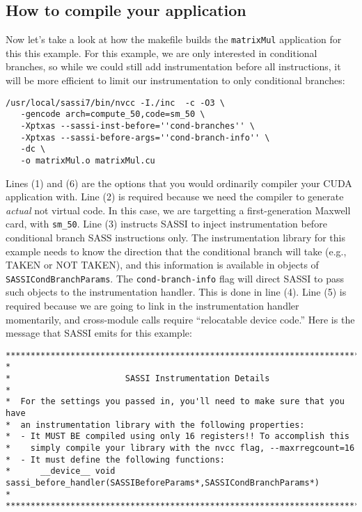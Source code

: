 \subsection{How to compile your application}

Now let's take a look at how the makefile builds the
\texttt{matrixMul} application for this this example.  For this
example, we are only interested in conditional branches, so while we
could still add instrumentation before all instructions, it will be
more efficient to limit our instrumentation to only conditional branches:
\begin{lstlisting}[style=BashInputStyle]
/usr/local/sassi7/bin/nvcc -I./inc  -c -O3 \
   -gencode arch=compute_50,code=sm_50 \
   -Xptxas --sassi-inst-before=''cond-branches'' \
   -Xptxas --sassi-before-args=''cond-branch-info'' \
   -dc \
   -o matrixMul.o matrixMul.cu
\end{lstlisting}

Lines (1) and (6) are the options that you would ordinarily compiler
your CUDA application with.  Line (2) is required because we need the
compiler to generate \emph{actual} not virtual code.  In this case, we
are targetting a first-generation Maxwell card, with \texttt{sm\_50}.
Line (3) instructs SASSI to inject instrumentation before conditional
branch SASS instructions only.  The instrumentation library for this
example needs to know the direction that the conditional branch will
take (e.g., TAKEN or NOT TAKEN), and this information is available in
objects of \texttt{SASSICondBranchParams}.  The
\texttt{cond-branch-info} flag will direct SASSI to pass such objects
to the instrumentation handler.  This is done in line (4).  Line (5)
is required because we are going to link in the instrumentation
handler momentarily, and cross-module calls require ``relocatable
device code.''  Here is the message that SASSI emits for this example:
\begin{verbatim}
******************************************************************************
*
*                       SASSI Instrumentation Details
*
*  For the settings you passed in, you'll need to make sure that you have
*  an instrumentation library with the following properties:
*  - It MUST BE compiled using only 16 registers!! To accomplish this
*    simply compile your library with the nvcc flag, --maxrregcount=16
*  - It must define the following functions:
*      __device__ void sassi_before_handler(SASSIBeforeParams*,SASSICondBranchParams*)
*
******************************************************************************
\end{verbatim}

